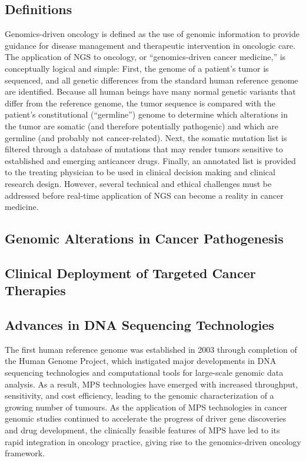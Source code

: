 \subsection{Definitions}
Genomics-driven oncology is defined as the use of genomic information to provide guidance for disease management and therapeutic intervention in oncologic care. The application of NGS to oncology, or “genomics-driven cancer medicine,” is conceptually logical and simple: First, the genome of a patient’s tumor is sequenced, and all genetic differences from the standard human reference genome are identified. Because all human beings have many normal genetic variants that differ from the reference genome, the tumor sequence is compared with the patient’s constitutional (“germline”) genome to determine which alterations in the tumor are somatic (and therefore potentially pathogenic) and which are germline (and probably not cancer-related). Next, the somatic mutation list is filtered through a database of mutations that may render tumors sensitive to established and emerging anticancer drugs. Finally, an annotated list is provided to the treating physician to be used in clinical decision making and clinical research design. However, several technical and ethical challenges must be addressed before real-time application of NGS can become a reality in cancer medicine.

\subsection{Genomic Alterations in Cancer Pathogenesis}

\subsection{Clinical Deployment of Targeted Cancer Therapies}

\subsection{Advances in DNA Sequencing Technologies}

The first human reference genome was established in 2003 through completion of the Human Genome Project, which instigated major developments in DNA sequencing technologies and computational tools for large-scale genomic data analysis. As a result, MPS technologies have emerged with increased throughput, sensitivity, and cost efficiency, leading to the genomic characterization of a growing number of tumours. As the application of MPS technologies in cancer genomic studies continued to accelerate the progress of driver gene discoveries and drug development, the clinically feasible features of MPS have led to its rapid integration in oncology practice, giving rise to the genomics-driven oncology framework.

